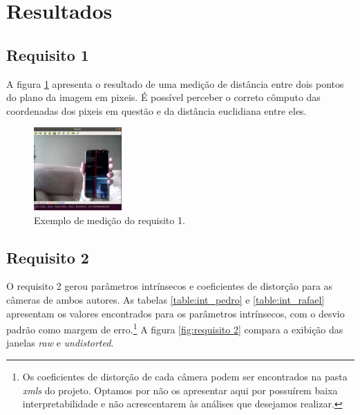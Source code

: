 \documentclass{bmvc2k}
\begin{document}
\section{Resultados}
\label{sec:res}
\subsection{Requisito 1}
A figura \ref{fig:requisito 1} apresenta o resultado de uma medição de distância entre dois pontos do plano da imagem em pixeis. É possível perceber o correto cômputo das coordenadas dos pixeis em questão e da distância euclidiana entre eles.

\begin{figure}[hbt]
  \centering
  \includegraphics[width=0.3\textwidth]{figs/requisito1.png}
  \caption{Exemplo de medição do requisito 1.}
  \label{fig:requisito 1}
\end{figure}


\subsection{Requisito 2}
O requisito 2 gerou parâmetros intrínsecos e coeficientes de distorção para as câmeras de ambos autores. As tabelas \ref{table:int_pedro} e \ref{table:int_rafael} apresentam os valores encontrados para os parâmetros intrínsecos, com o desvio padrão como margem de erro.\footnote{Os coeficientes de distorção de cada câmera podem ser encontrados na pasta \textit{xmls} do projeto. Optamos por não os apresentar aqui por possuírem baixa interpretabilidade e não acrescentarem às análises que desejamos realizar.} A figura \ref{fig:requisito 2} compara a exibição das janelas \textit{raw} e \textit{undistorted}.
\end{document}
